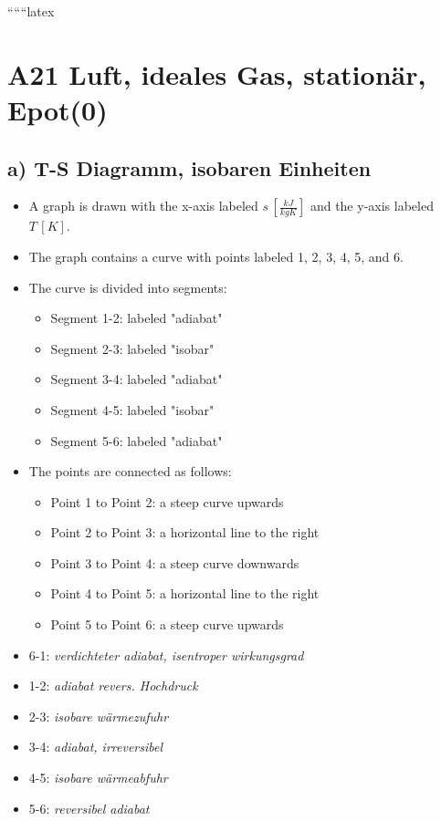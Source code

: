 
``````latex


\section*{A21 Luft, ideales Gas, stationär, Epot(0)}

\subsection*{a) T-S Diagramm, isobaren Einheiten}

\begin{itemize}
    \item A graph is drawn with the x-axis labeled $s \, [\frac{kJ}{kgK}]$ and the y-axis labeled $T \, [K]$.
    \item The graph contains a curve with points labeled 1, 2, 3, 4, 5, and 6.
    \item The curve is divided into segments:
        \begin{itemize}
            \item Segment 1-2: labeled "adiabat"
            \item Segment 2-3: labeled "isobar"
            \item Segment 3-4: labeled "adiabat"
            \item Segment 4-5: labeled "isobar"
            \item Segment 5-6: labeled "adiabat"
        \end{itemize}
    \item The points are connected as follows:
        \begin{itemize}
            \item Point 1 to Point 2: a steep curve upwards
            \item Point 2 to Point 3: a horizontal line to the right
            \item Point 3 to Point 4: a steep curve downwards
            \item Point 4 to Point 5: a horizontal line to the right
            \item Point 5 to Point 6: a steep curve upwards
        \end{itemize}
\end{itemize}

\begin{itemize}
    \item 6-1: \textit{verdichteter adiabat, isentroper wirkungsgrad}
    \item 1-2: \textit{adiabat revers. Hochdruck}
    \item 2-3: \textit{isobare wärmezufuhr}
    \item 3-4: \textit{adiabat, irreversibel}
    \item 4-5: \textit{isobare wärmeabfuhr}
    \item 5-6: \textit{reversibel adiabat}
\end{itemize}

